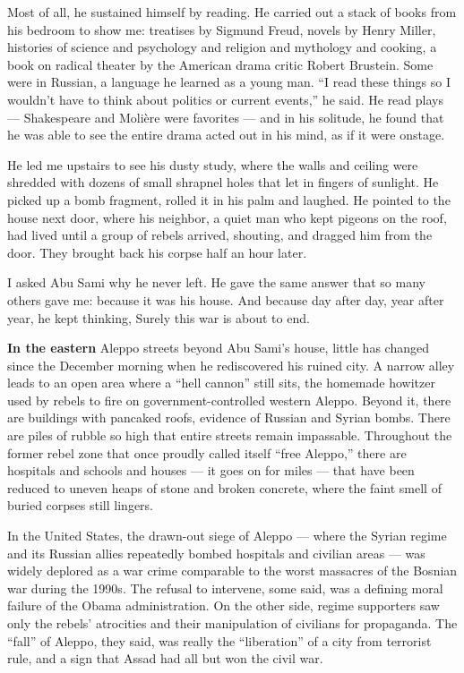 Most of all, he sustained himself by reading. He carried out a stack of
books from his bedroom to show me: treatises by Sigmund Freud, novels by
Henry Miller, histories of science and psychology and religion and
mythology and cooking, a book on radical theater by the American drama
critic Robert Brustein. Some were in Russian, a language he learned as a
young man. ``I read these things so I wouldn't have to think about
politics or current events,'' he said. He read plays --- Shakespeare and
Molière were favorites --- and in his solitude, he found that he was
able to see the entire drama acted out in his mind, as if it were
onstage.

He led me upstairs to see his dusty study, where the walls and ceiling
were shredded with dozens of small shrapnel holes that let in fingers of
sunlight. He picked up a bomb fragment, rolled it in his palm and
laughed. He pointed to the house next door, where his neighbor, a quiet
man who kept pigeons on the roof, had lived until a group of rebels
arrived, shouting, and dragged him from the door. They brought back his
corpse half an hour later.

I asked Abu Sami why he never left. He gave the same answer that so many
others gave me: because it was his house. And because day after day,
year after year, he kept thinking, Surely this war is about to end.

\textbf{In the eastern} Aleppo streets beyond Abu Sami's house, little
has changed since the December morning when he rediscovered his ruined
city. A narrow alley leads to an open area where a ``hell cannon'' still
sits, the homemade howitzer used by rebels to fire on
government-controlled western Aleppo. Beyond it, there are buildings
with pancaked roofs, evidence of Russian and Syrian bombs. There are
piles of rubble so high that entire streets remain impassable.
Throughout the former rebel zone that once proudly called itself ``free
Aleppo,'' there are hospitals and schools and houses --- it goes on for
miles --- that have been reduced to uneven heaps of stone and broken
concrete, where the faint smell of buried corpses still lingers.

In the United States, the drawn-out siege of Aleppo --- where the Syrian
regime and its Russian allies repeatedly bombed hospitals and civilian
areas --- was widely deplored as a war crime comparable to the worst
massacres of the Bosnian war during the 1990s. The refusal to intervene,
some said, was a defining moral failure of the Obama administration. On
the other side, regime supporters saw only the rebels' atrocities and
their manipulation of civilians for propaganda. The ``fall'' of Aleppo,
they said, was really the ``liberation'' of a city from terrorist rule,
and a sign that Assad had all but won the civil war.

